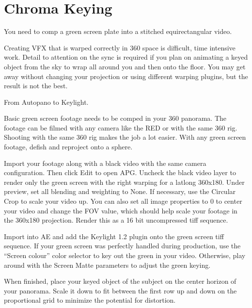 \chapter{Chroma Keying}
\pagecolor{white}
\label{chap:53}
\begin{fullwidth}

\problem

{\large You need to comp a green screen plate into a stitched equirectangular video. \par}

Creating VFX that is warped correctly in 360 space is difficult, time intensive work. Detail to attention on the sync is required if you plan on animating a keyed object from the sky to wrap all around you and then onto the floor. You may get away without changing your projection or using different warping plugins, but the result is not the best. 

\solution

{\large From Autopano to Keylight. \par}

Basic green screen footage needs to be comped in your 360 panorama. The footage can be filmed with any camera like the RED or with the same 360 rig. Shooting with the same 360 rig makes the job a lot easier. With any green screen footage, defish and reproject onto a sphere. 

Import your footage along with a black video with the same camera configuration. Then click Edit to open APG. Uncheck the black video layer to render only the green screen with the right warping for a latlong 360x180. Under preview, set all blending and weighting to None. If necessary, use the Circular Crop to scale your video up. You can also set all image properties to 0 to center your video and change the FOV value, which should help scale your footage in the 360x180 projection. Render this as a 16 bit uncompressed tiff sequence.

Import into AE and add the Keylight 1.2 plugin onto the green screen tiff sequence. If your green screen was perfectly handled during production, use the “Screen colour” color selector to key out the green in your video. Otherwise, play around with the Screen Matte parameters to adjust the green keying.

When finished, place your keyed object of the subject on the center horizon of your panorama. Scale it down to fit between the first row up and down on the proportional grid to minimize the potential for distortion.


\end{fullwidth}
